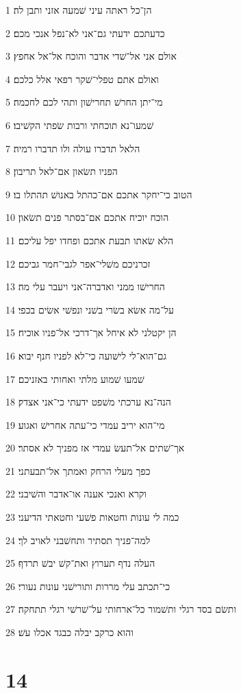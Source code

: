 \par 1 הן־כל ראתה עיני שׁמעה אזני ותבן לה׃
\par 2 כדעתכם ידעתי גם־אני לא־נפל אנכי מכם׃
\par 3 אולם אני אל־שׁדי אדבר והוכח אל־אל אחפץ׃
\par 4 ואולם אתם טפלי־שׁקר רפאי אלל כלכם׃
\par 5 מי־יתן החרשׁ תחרישׁון ותהי לכם לחכמה׃
\par 6 שׁמעו־נא תוכחתי ורבות שׂפתי הקשׁיבו׃
\par 7 הלאל תדברו עולה ולו תדברו רמיה׃
\par 8 הפניו תשׂאון אם־לאל תריבון׃
\par 9 הטוב כי־יחקר אתכם אם־כהתל באנושׁ תהתלו בו׃
\par 10 הוכח יוכיח אתכם אם־בסתר פנים תשׂאון׃
\par 11 הלא שׂאתו תבעת אתכם ופחדו יפל עליכם׃
\par 12 זכרניכם משׁלי־אפר לגבי־חמר גביכם׃
\par 13 החרישׁו ממני ואדברה־אני ויעבר עלי מה׃
\par 14 על־מה אשׂא בשׂרי בשׁני ונפשׁי אשׂים בכפי׃
\par 15 הן יקטלני לא איחל אך־דרכי אל־פניו אוכיח׃
\par 16 גם־הוא־לי לישׁועה כי־לא לפניו חנף יבוא׃
\par 17 שׁמעו שׁמוע מלתי ואחותי באזניכם׃
\par 18 הנה־נא ערכתי משׁפט ידעתי כי־אני אצדק׃
\par 19 מי־הוא יריב עמדי כי־עתה אחרישׁ ואגוע׃
\par 20 אך־שׁתים אל־תעשׂ עמדי אז מפניך לא אסתר׃
\par 21 כפך מעלי הרחק ואמתך אל־תבעתני׃
\par 22 וקרא ואנכי אענה או־אדבר והשׁיבני׃
\par 23 כמה לי עונות וחטאות פשׁעי וחטאתי הדיעני׃
\par 24 למה־פניך תסתיר ותחשׁבני לאויב לך׃
\par 25 העלה נדף תערוץ ואת־קשׁ יבשׁ תרדף׃
\par 26 כי־תכתב עלי מררות ותורישׁני עונות נעורי׃
\par 27 ותשׂם בסד רגלי ותשׁמור כל־ארחותי על־שׁרשׁי רגלי תתחקה׃
\par 28 והוא כרקב יבלה כבגד אכלו עשׁ׃

\chapter{14}

